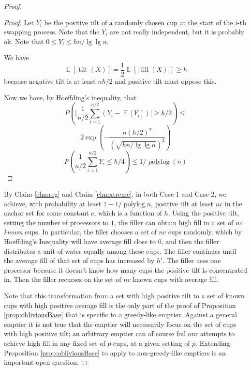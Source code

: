 \documentclass[twocolumn]{article}[10pt]
\DeclareMathOperator{\E}{\mathbb{E}}
\DeclareMathOperator{\polylog}{\text{polylog}}
\DeclareMathOperator{\tilt}{\text{tilt}}
\DeclareMathOperator{\fil}{\text{fill}}
\begin{document}
\begin{proof}
\begin{proof}
  Let $Y_i$ be the positive tilt of a randomly chosen cup at the start of the
  $i$-th swapping process. {\color{red}Note that the $Y_i$ are not
  really independent, but it is probably ok}. Note that $0\le Y_i \le hn/\lg\lg
  n$.

  We have
  $$\E[\tilt(X)] = \frac{1}{2}\E[|\fil(X)|] \ge h$$
  because negative tilt is at least $nh/2$ and positive tilt must oppose this.
  
  Now we have, by Hoeffding's inequality, that 
  $$P\left(\Big|\frac{1}{n/2} \sum_{i=1}^{n/2} (Y_i - \E[Y_i])\Big|\ge h/2
  \right) \le$$
  $$2\exp\left(-\frac{n(h/2)^2}{(\sqrt{hn/\lg\lg n})^2}\right) $$
  $$P\left(\frac{1}{n/2}\sum_{i=1}^{n/2} Y_i \le h/4\right) \le 1/\polylog(n) $$

\end{proof}
  By Claim \ref{clm:reg} and Claim \ref{clm:xtreme}, in both Case 1 and Case 2,
  we achieve, with probability at least $1-1/\polylog n$,
  positive tilt at least $nc$ in the anchor set for some constant $c$, which is
  a function of $h$. Using the positive tilt, setting the number of processors
  to $1$, the filler can obtain high fill in a set of $nc$ \emph{known} cups.
  In particular, the filler chooses a set of $nc$ cups randomly, which by
  Hoeffding's Inequality will have average fill close to $0$, and then the
  filler distributes a unit of water equally among these cups. The filler
  continues until the average fill of that set of cups has increased by $h'$.
  The filler uses one processor because it doesn't know how many cups the
  positive tilt is concentrated in. Then the filler recurses on the set of $nc$ 
  known cups with average fill.

  Note that this transformation from a set with high positive tilt to a set of
  known cups with high positive average fill is the only part of the proof of
  Proposition \ref{prop:obliviousBase} that is specific to a greedy-like
  emptier. Against a general emptier it is not true that the emptier will
  necessarily focus on the set of cups with high positive tilt; an arbitrary
  emptier can of course foil our attempts to achieve high fill in any fixed set
  of $p$ cups, at a given setting of $p$. Extending Proposition
  \ref{prop:obliviousBase} to apply to non-greedy-like emptiers is an important
  open question.
\end{proof}
\end{document}
